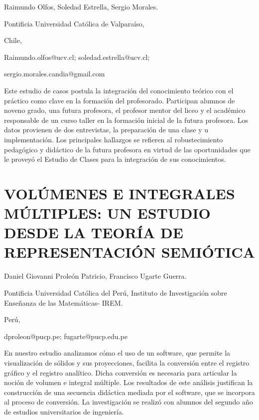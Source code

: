\begin{datos}

Raimundo Olfos, Soledad Estrella, Sergio Morales.

Pontificia Universidad Católica de Valparaíso,

Chile,

Raimundo.olfos@ucv.cl; soledad.estrella@ucv.cl;

sergio.morales.candia@gmail.com 

\end{datos}

Este estudio de casos postula la integración del conocimiento teórico
con el práctico como clave en la formación del profesorado. Participan
alumnos de noveno grado, una futura profesora, el profesor mentor
del liceo y el académico responsable de un curso taller en la formación
inicial de la futura profesora. Los datos provienen de dos entrevistas,
la preparación de una clase y u implementación. Los principales hallazgos
se refieren al robustecimiento pedagógico y didáctico de la futura
profesora en virtud de las oportunidades que le proveyó el Estudio
de Clases para la integración de sus conocimientos. 


\section{VOLÚMENES E INTEGRALES MÚLTIPLES: UN ESTUDIO DESDE LA TEORÍA DE REPRESENTACIÓN
SEMIÓTICA }

\begin{datos}

Daniel Giovanni Proleón Patricio, Francisco Ugarte Guerra.

Pontificia Universidad Católica del Perú, Instituto de Investigación
sobre Enseñanza de las Matemáticas- IREM.

Perú,

dproleon@pucp.pe; fugarte@pucp.edu.pe

\end{datos}

En nuestro estudio analizamos cómo el uso de un software, que permite
la visualización de sólidos y sus proyecciones, facilita la conversión
entre el registro gráfico y el registro analítico. Dicha conversión
es necesaria para articular la noción de volumen e integral múltiple.
Los resultados de este análisis justifican la construcción de una
secuencia didáctica mediada por el software, que se incorpora al proceso
de conversión. La investigación se realizó con alumnos del segundo
año de estudios universitarios de ingeniería.



